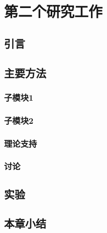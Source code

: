 \chapter{第二个研究工作}
\section{引言}

\section{主要方法}
\subsection{子模块1}
\subsection{子模块2}
\subsection{理论支持}
\subsection{讨论}

\section{实验}

\section{本章小结}
